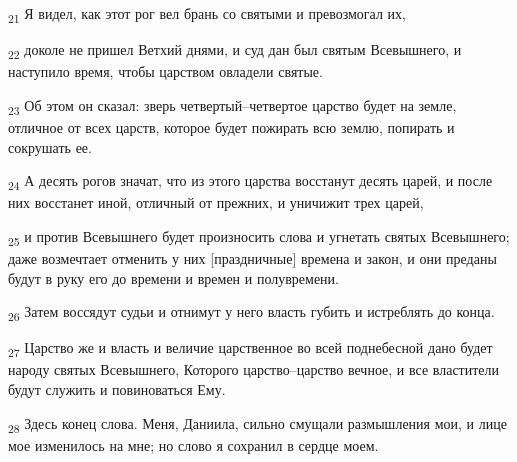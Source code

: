 \begin{tcolorbox}
\textsubscript{21} Я видел, как этот рог вел брань со святыми и превозмогал их,
\end{tcolorbox}
\begin{tcolorbox}
\textsubscript{22} доколе не пришел Ветхий днями, и суд дан был святым Всевышнего, и наступило время, чтобы царством овладели святые.
\end{tcolorbox}
\begin{tcolorbox}
\textsubscript{23} Об этом он сказал: зверь четвертый--четвертое царство будет на земле, отличное от всех царств, которое будет пожирать всю землю, попирать и сокрушать ее.
\end{tcolorbox}
\begin{tcolorbox}
\textsubscript{24} А десять рогов значат, что из этого царства восстанут десять царей, и после них восстанет иной, отличный от прежних, и уничижит трех царей,
\end{tcolorbox}
\begin{tcolorbox}
\textsubscript{25} и против Всевышнего будет произносить слова и угнетать святых Всевышнего; даже возмечтает отменить у них [праздничные] времена и закон, и они преданы будут в руку его до времени и времен и полувремени.
\end{tcolorbox}
\begin{tcolorbox}
\textsubscript{26} Затем воссядут судьи и отнимут у него власть губить и истреблять до конца.
\end{tcolorbox}
\begin{tcolorbox}
\textsubscript{27} Царство же и власть и величие царственное во всей поднебесной дано будет народу святых Всевышнего, Которого царство--царство вечное, и все властители будут служить и повиноваться Ему.
\end{tcolorbox}
\begin{tcolorbox}
\textsubscript{28} Здесь конец слова. Меня, Даниила, сильно смущали размышления мои, и лице мое изменилось на мне; но слово я сохранил в сердце моем.
\end{tcolorbox}
